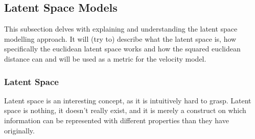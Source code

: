 \subsection{Latent Space Models}
\label{sec:Method:LSM}
This subsection delves with explaining and understanding the latent space modelling approach.
It will (try to) describe what the latent space is, how specifically the euclidean latent space works and how the squared euclidean distance can and will be used as a metric for the velocity model.


\subsubsection{Latent Space}
\label{sec:Method:LSM:LatentSpace}
Latent space is an interesting concept, as it is intuitively hard to grasp.
Latent space is nothing, it doesn't really exist, and it is merely a construct on which information can be represented with different properties than they have originally.
\\



